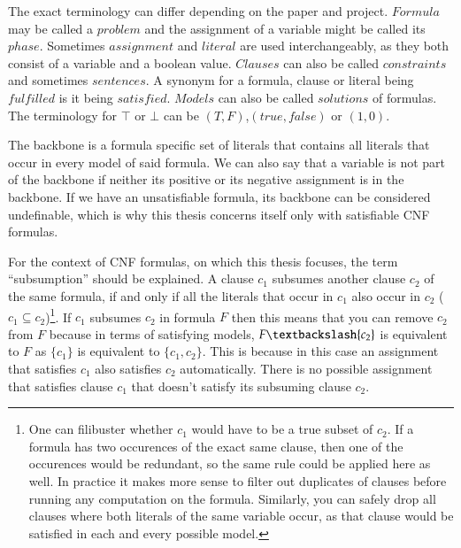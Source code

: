 

The exact terminology can differ depending on the paper and project. $Formula$ may be called a $problem$ and the assignment of a variable might be called its $phase$. Sometimes $assignment$ and $literal$ are used interchangeably, as they both consist of a variable and a boolean value. $Clauses$ can also be called $constraints$ and sometimes $sentences$. A synonym for a formula, clause or literal being $fulfilled$ is it being $satisfied$. $Models$ can also be called $solutions$ of formulas. The terminology for $\top$ or $\bot$ can be $(T,F)$,$(true,false)$ or $(1,0)$.

The backbone is a formula specific set of literals that contains all literals that occur in every model of said formula. We can also say that a variable is not part of the backbone if neither its positive or its negative assignment is in the backbone. If we have an unsatisfiable formula, its backbone can be considered undefinable, which is why this thesis concerns itself only with satisfiable CNF formulas.

For the context of CNF formulas, on which this thesis focuses, the term ``subsumption'' should be explained. A clause $c_1$ subsumes another clause $c_2$ of the same formula, if and only if all the literals that occur in $c_1$ also occur in $c_2$ ($c_1 \subseteq c_2$)\footnote{
	One can filibuster whether $c_1$ would have to be a true subset of $c_2$. If a formula has two occurences of the exact same clause, then one of the occurences would be redundant, so the same rule could be applied here as well. In practice it makes more sense to filter out duplicates of clauses before running any computation on the formula. Similarly, you can safely drop all clauses where both literals of the same variable occur, as that clause would be satisfied in each and every possible model.}.
If $c_1$ subsumes $c_2$ in formula $F$ then this means that you can remove $c_2$ from $F$ because in terms of satisfying models, $F\textbackslash \{c_2\}$ is equivalent to $F$ as $\{c_1\}$ is equivalent to $\{c_1,c_2\}$. This is because in this case an assignment that satisfies $c_1$ also satisfies $c_2$ automatically. There is no possible assignment that satisfies clause $c_1$ that doesn't satisfy its subsuming clause $c_2$.


